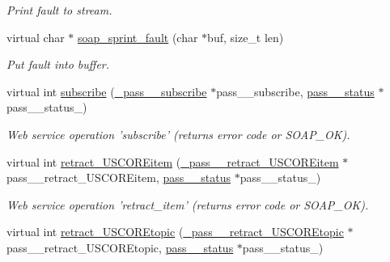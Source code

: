 \begin{DoxyCompactItemize}
\begin{DoxyCompactList}\small\item\em Print fault to stream. \item\end{DoxyCompactList}\item 
\hypertarget{classPASSPortBindingProxy_ac9cce6b2261ba987e6ba043e547d7cb5}{
virtual char $\ast$ \hyperlink{classPASSPortBindingProxy_ac9cce6b2261ba987e6ba043e547d7cb5}{soap\_\-sprint\_\-fault} (char $\ast$buf, size\_\-t len)}
\label{classPASSPortBindingProxy_ac9cce6b2261ba987e6ba043e547d7cb5}

\begin{DoxyCompactList}\small\item\em Put fault into buffer. \item\end{DoxyCompactList}\item 
\hypertarget{classPASSPortBindingProxy_a06d0a34b5ad83073405c413f92c0586f}{
virtual int \hyperlink{classPASSPortBindingProxy_a06d0a34b5ad83073405c413f92c0586f}{subscribe} (\hyperlink{class__pass____subscribe}{\_\-pass\_\-\_\-subscribe} $\ast$pass\_\-\_\-subscribe, \hyperlink{classpass____status}{pass\_\-\_\-status} $\ast$pass\_\-\_\-status\_\-)}
\label{classPASSPortBindingProxy_a06d0a34b5ad83073405c413f92c0586f}

\begin{DoxyCompactList}\small\item\em Web service operation 'subscribe' (returns error code or SOAP\_\-OK). \item\end{DoxyCompactList}\item 
\hypertarget{classPASSPortBindingProxy_a25d2139ea04b97b1db3029a8bce2abe2}{
virtual int \hyperlink{classPASSPortBindingProxy_a25d2139ea04b97b1db3029a8bce2abe2}{retract\_\-USCOREitem} (\hyperlink{class__pass____retract__USCOREitem}{\_\-pass\_\-\_\-retract\_\-USCOREitem} $\ast$pass\_\-\_\-retract\_\-USCOREitem, \hyperlink{classpass____status}{pass\_\-\_\-status} $\ast$pass\_\-\_\-status\_\-)}
\label{classPASSPortBindingProxy_a25d2139ea04b97b1db3029a8bce2abe2}

\begin{DoxyCompactList}\small\item\em Web service operation 'retract\_\-item' (returns error code or SOAP\_\-OK). \item\end{DoxyCompactList}\item 
\hypertarget{classPASSPortBindingProxy_a606ef3fbf31ee7dbb019fbbdfb50a6b2}{
virtual int \hyperlink{classPASSPortBindingProxy_a606ef3fbf31ee7dbb019fbbdfb50a6b2}{retract\_\-USCOREtopic} (\hyperlink{class__pass____retract__USCOREtopic}{\_\-pass\_\-\_\-retract\_\-USCOREtopic} $\ast$pass\_\-\_\-retract\_\-USCOREtopic, \hyperlink{classpass____status}{pass\_\-\_\-status} $\ast$pass\_\-\_\-status\_\-)}
\label{classPASSPortBindingProxy_a606ef3fbf31ee7dbb019fbbdfb50a6b2}


\end{DoxyCompactItemize}
